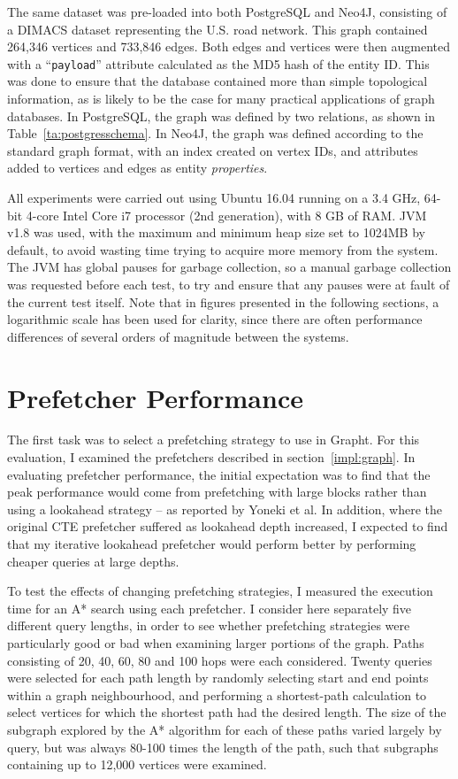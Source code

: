 The same dataset was pre-loaded into both PostgreSQL and Neo4J, consisting of
a DIMACS dataset representing the U.S. road network\cite{dimacs}. This graph
contained 264,346 vertices and 733,846 edges. Both edges and vertices were then
augmented with a ``\texttt{payload}'' attribute calculated as the MD5 hash of the
entity ID. This was done to ensure that the database contained more than
simple topological information, as is likely to be the case for many practical
applications of graph databases. In PostgreSQL, the graph was defined by two
relations, as shown in Table~\ref{ta:postgresschema}. In Neo4J, the graph was
defined according to the standard graph format, with an index created on
vertex IDs, and attributes added to vertices and edges as entity
\textit{properties}.

All experiments were carried out using Ubuntu 16.04 running on a 3.4 GHz, 64-bit 4-core
Intel Core i7 processor (2nd generation), with 8 GB of RAM. JVM v1.8 was used,
with the maximum and minimum heap size set to 1024MB by default, to avoid
wasting time trying to acquire more memory from the system. The JVM has global
pauses for garbage collection, so a manual garbage collection was requested
before each test, to try and ensure that any pauses were at fault of the
current test itself. Note that in figures presented in the following sections, a logarithmic scale has been used for clarity, since there are often
performance differences of several orders of magnitude between the systems.


\section{Prefetcher Performance}
\label{sec:prefetcher_performance}

The first task was to select a prefetching strategy to use in Grapht. For this
evaluation, I examined the prefetchers described in section~\ref{impl:graph}.
In evaluating prefetcher performance, the initial expectation was to find that
the peak performance would come from prefetching with large blocks rather than
using a lookahead strategy -- as reported by Yoneki et al. In addition, where
the original CTE prefetcher suffered as lookahead depth increased, I expected
to find that my iterative lookahead prefetcher would perform better by
performing cheaper queries at large depths.

To test the effects of changing prefetching strategies, I measured the execution time for
an A* search using each prefetcher. I consider here separately
five different query lengths, in order to see whether prefetching strategies
were particularly good or bad when examining larger portions of the graph.
Paths consisting of 20, 40, 60, 80 and 100 hops were each considered. Twenty
queries were selected for each path length by randomly selecting start and end
points within a graph neighbourhood, and performing a shortest-path
calculation to select vertices for which the shortest path had the desired length. The size of the
subgraph explored by the A* algorithm for each of these paths varied largely
by query, but was always 80-100 times the length of the path, such that subgraphs
containing up to 12,000 vertices were examined.

